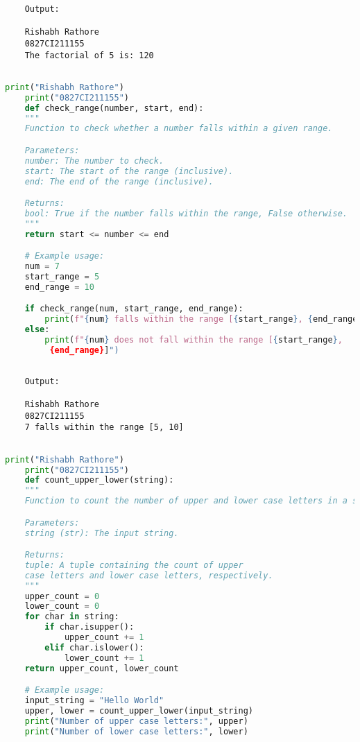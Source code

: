 \documentclass{report}
\begin{document}
\begin{verbatim}
	Output:

	Rishabh Rathore
	0827CI211155
	The factorial of 5 is: 120
	

\end{verbatim}


\newpage


\sol 
\begin{lstlisting}[language=Python]
	print("Rishabh Rathore")
	print("0827CI211155")
	def check_range(number, start, end):
    """
    Function to check whether a number falls within a given range.

    Parameters:
    number: The number to check.
    start: The start of the range (inclusive).
    end: The end of the range (inclusive).

    Returns:
    bool: True if the number falls within the range, False otherwise.
    """
    return start <= number <= end

	# Example usage:
	num = 7
	start_range = 5
	end_range = 10

	if check_range(num, start_range, end_range):
		print(f"{num} falls within the range [{start_range}, {end_range}]")
	else:
		print(f"{num} does not fall within the range [{start_range},
		 {end_range}]")
  

\end{lstlisting}

\begin{verbatim}
	Output:

	Rishabh Rathore
	0827CI211155
	7 falls within the range [5, 10]


\end{verbatim}


\newpage


\sol 
\begin{lstlisting}[language=Python]
	print("Rishabh Rathore")
	print("0827CI211155")
	def count_upper_lower(string):
    """
    Function to count the number of upper and lower case letters in a string.

    Parameters:
    string (str): The input string.

    Returns:
    tuple: A tuple containing the count of upper 
	case letters and lower case letters, respectively.
    """
    upper_count = 0
    lower_count = 0
    for char in string:
        if char.isupper():
            upper_count += 1
        elif char.islower():
            lower_count += 1
    return upper_count, lower_count

	# Example usage:
	input_string = "Hello World"
	upper, lower = count_upper_lower(input_string)
	print("Number of upper case letters:", upper)
	print("Number of lower case letters:", lower)

\end{lstlisting}
\end{document}
